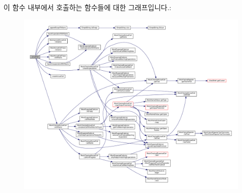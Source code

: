 이 함수 내부에서 호출하는 함수들에 대한 그래프입니다.\+:
\nopagebreak
\begin{figure}[H]
\begin{center}
\leavevmode
\includegraphics[width=350pt]{class_mock_support_a9b0ef024cdc513368395ef23d9e3af39_cgraph}
\end{center}
\end{figure}




